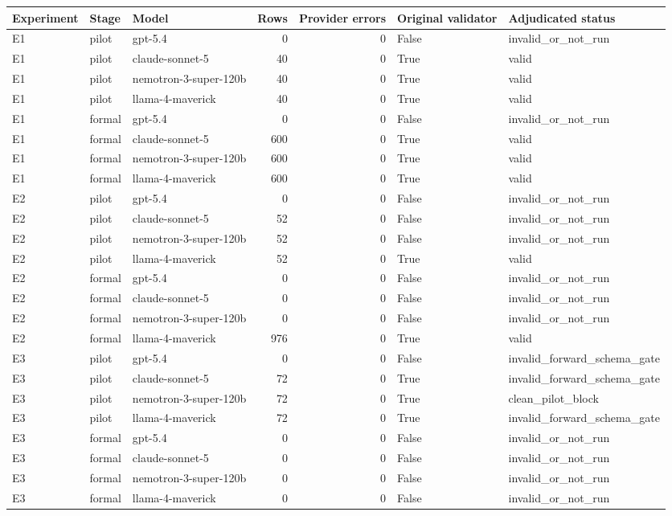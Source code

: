 \begin{tabular}{lllrrll}
\toprule
Experiment & Stage & Model & Rows & Provider errors & Original validator & Adjudicated status \\
\midrule
E1 & pilot & gpt-5.4 & 0 & 0 & False & invalid\_or\_not\_run \\
E1 & pilot & claude-sonnet-5 & 40 & 0 & True & valid \\
E1 & pilot & nemotron-3-super-120b & 40 & 0 & True & valid \\
E1 & pilot & llama-4-maverick & 40 & 0 & True & valid \\
E1 & formal & gpt-5.4 & 0 & 0 & False & invalid\_or\_not\_run \\
E1 & formal & claude-sonnet-5 & 600 & 0 & True & valid \\
E1 & formal & nemotron-3-super-120b & 600 & 0 & True & valid \\
E1 & formal & llama-4-maverick & 600 & 0 & True & valid \\
E2 & pilot & gpt-5.4 & 0 & 0 & False & invalid\_or\_not\_run \\
E2 & pilot & claude-sonnet-5 & 52 & 0 & False & invalid\_or\_not\_run \\
E2 & pilot & nemotron-3-super-120b & 52 & 0 & False & invalid\_or\_not\_run \\
E2 & pilot & llama-4-maverick & 52 & 0 & True & valid \\
E2 & formal & gpt-5.4 & 0 & 0 & False & invalid\_or\_not\_run \\
E2 & formal & claude-sonnet-5 & 0 & 0 & False & invalid\_or\_not\_run \\
E2 & formal & nemotron-3-super-120b & 0 & 0 & False & invalid\_or\_not\_run \\
E2 & formal & llama-4-maverick & 976 & 0 & True & valid \\
E3 & pilot & gpt-5.4 & 0 & 0 & False & invalid\_forward\_schema\_gate \\
E3 & pilot & claude-sonnet-5 & 72 & 0 & True & invalid\_forward\_schema\_gate \\
E3 & pilot & nemotron-3-super-120b & 72 & 0 & True & clean\_pilot\_block \\
E3 & pilot & llama-4-maverick & 72 & 0 & True & invalid\_forward\_schema\_gate \\
E3 & formal & gpt-5.4 & 0 & 0 & False & invalid\_or\_not\_run \\
E3 & formal & claude-sonnet-5 & 0 & 0 & False & invalid\_or\_not\_run \\
E3 & formal & nemotron-3-super-120b & 0 & 0 & False & invalid\_or\_not\_run \\
E3 & formal & llama-4-maverick & 0 & 0 & False & invalid\_or\_not\_run \\
\bottomrule
\end{tabular}
